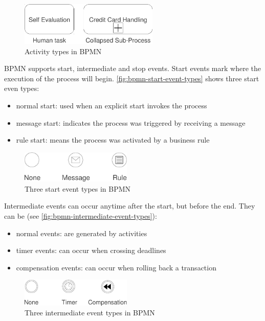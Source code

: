 \begin{figure}[H]
\centering
\includegraphics[width=250px,keepaspectratio]{bpmn-activity-types.pdf}
\caption{Activity types in BPMN}
\label{fig:bpmn-activity-types}
\end{figure}

BPMN supports start, intermediate and stop events. Start events mark where the
execution of the process will begin. \autoref{fig:bpmn-start-event-types}
shows three start even types:

\begin{itemize}
\item normal start: used when an explicit start invokes the process
\item message start: indicates the process was triggered by receiving a message
\item rule start: means the process was activated by a business rule
\end{itemize}

\begin{figure}[H]
\centering
\includegraphics[width=200px,keepaspectratio]{bpmn-start-event-types.pdf}
\caption{Three start event types in BPMN}
\label{fig:bpmn-start-event-types}
\end{figure}

Intermediate events can occur anytime after the start, but before the end. They
can be (see \autoref{fig:bpmn-intermediate-event-types}):

\begin{itemize}
\item normal events: are generated by activities
\item timer events: can occur when crossing deadlines
\item compensation events: can occur when rolling back a transaction
\end{itemize}

\begin{figure}[H]
\centering
\includegraphics[width=200px,keepaspectratio]{bpmn-intermediate-event-types.pdf}
\caption{Three intermediate event types in BPMN}
\label{fig:bpmn-intermediate-event-types}
\end{figure}

